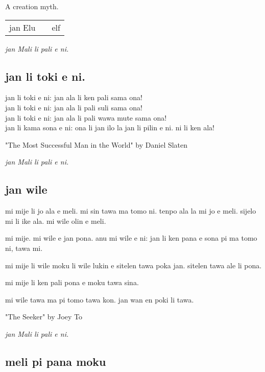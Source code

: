 A creation myth.

\begin{supertabular}{p{5,5cm}|ll}
jan Elu && elf \\
\end{supertabular}

\textit{jan Mali li pali e ni. \cite{www:astrodonunt:01}}

\subsection{jan li toki e ni.}

jan li toki e ni: jan ala li ken pali sama ona! \\
jan li toki e ni: jan ala li pali suli sama ona! \\
jan li toki e ni: jan ala li pali wawa mute sama ona! \\
jan li kama sona e ni: ona li jan ilo la jan li pilin e ni. ni li ken ala! 

"The Most Successful Man in the World" by Daniel Slaten

\textit{jan Mali li pali e ni. \cite{www:astrodonunt:01}}

\newpage
\subsection{jan wile}

mi mije li jo ala e meli. 
mi sin tawa ma tomo ni. 
tenpo ala la mi jo e meli. 
sijelo mi li ike ala. 
mi wile olin e meli.

mi mije. 
mi wile e jan pona. 
anu mi wile e ni: jan li ken pana e sona pi ma tomo ni, tawa mi.

mi mije li wile moku li wile lukin e sitelen tawa poka jan. 
sitelen tawa ale li pona.

mi mije li ken pali pona e moku tawa sina.

mi wile tawa ma pi tomo tawa kon. 
jan wan en poki li tawa.

"The Seeker" by Joey To

\textit{jan Mali li pali e ni. \cite{www:astrodonunt:01}}

\subsection{meli pi pana moku}


